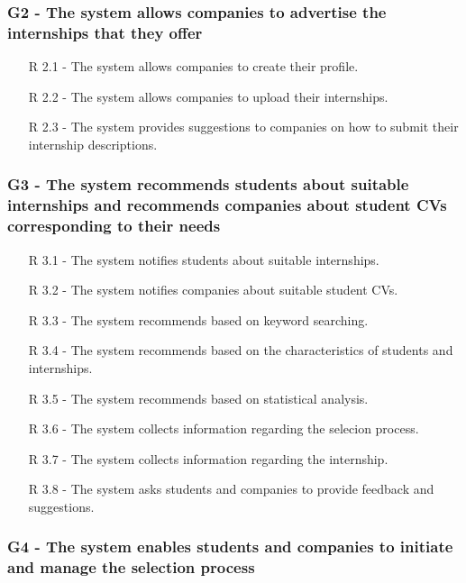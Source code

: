 \subsubsection{G2 - The system allows companies to advertise the internships that they offer}
\hspace*{15mm}
\begin{itemize}
    \item [R 2.1] - The system allows companies to create their profile.
    \item [R 2.2] - The system allows companies to upload their internships.
    \item [R 2.3] - The system provides suggestions to companies on how to submit their internship descriptions.
\end{itemize}
\hspace*{15mm}

\subsubsection{G3 - The system recommends students about suitable internships and recommends
companies about student CVs corresponding to their needs}
\hspace*{15mm}
\begin{itemize}
    \item [R 3.1] - The system notifies students about suitable internships.
    \item [R 3.2] - The system notifies companies about suitable student CVs.
    \item [R 3.3] - The system recommends based on keyword searching.
    \item [R 3.4] - The system recommends based on the characteristics of students and internships.
    \item [R 3.5] - The system recommends based on statistical analysis.
    \item [R 3.6] - The system collects information regarding the selecion process.
    \item [R 3.7] - The system collects information regarding the internship.
    \item [R 3.8] - The system asks students and companies to provide feedback and suggestions.
\end{itemize}
\hspace*{15mm}

\subsubsection{G4 - The system enables students and companies to initiate and manage the selection process}
\hspace*{15mm}



